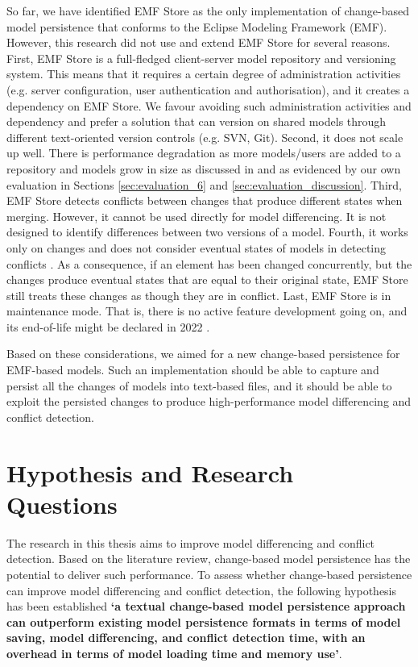 So far, we have identified EMF Store as the only implementation of change-based model persistence that conforms to the Eclipse Modeling Framework (EMF). However, this research did not use and extend EMF Store for several reasons. First, EMF Store is a full-fledged client-server model repository and versioning system. This means that it requires a certain degree of administration activities (e.g. server configuration, user authentication and authorisation), and it creates a dependency on EMF Store. We favour avoiding such administration activities and dependency and prefer a solution that can version on shared models through different text-oriented version controls (e.g. SVN, Git). Second, it does not scale up well. There is performance degradation as more models/users are added to a repository and models grow in size as discussed in \cite{KolovosRMPGCLRV13} and as evidenced by our own evaluation in Sections \ref{sec:evaluation_6} and \ref{sec:evaluation_discussion}. Third, EMF Store detects conflicts between changes that produce different states when merging. However, it cannot be used directly for model differencing. It is not designed to identify differences between two versions of a model. Fourth, it works only on changes and does not consider eventual states of models in detecting conflicts \cite{DBLP:conf/sfm/BroschKLSWW12}. As a consequence, if an element has been changed concurrently, but the changes produce eventual states that are equal to their original state, EMF Store still treats these changes as though they are in conflict. Last, EMF Store is in maintenance mode. That is, there is no active feature development going on, and its end-of-life might be declared in 2022 \cite{emfstore2019what}.

Based on these considerations, we aimed for a new change-based persistence for EMF-based models. Such an implementation should be able to capture and persist all the changes of models into text-based files, and it should be able to exploit the persisted changes to produce high-performance model differencing and conflict detection.

\section{Hypothesis and Research Questions}
\label{sec:research_questions}
The research in this thesis aims to improve model differencing and conflict detection. Based on the literature review, change-based model persistence has the potential to deliver such performance. To assess whether change-based persistence can improve model differencing and conflict detection, the following hypothesis has been established \textbf{‘a textual change-based model persistence approach can outperform existing model persistence formats in terms of model saving, model differencing, and conflict detection time, with an overhead in terms of model loading time and memory use’}.

